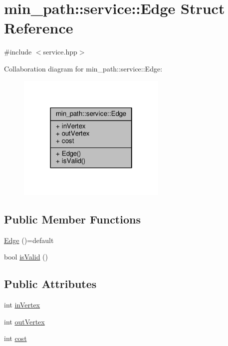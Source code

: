 \hypertarget{a00004}{}\section{min\+\_\+path\+:\+:service\+:\+:Edge Struct Reference}
\label{a00004}


{\ttfamily \#include $<$service.\+hpp$>$}



Collaboration diagram for min\+\_\+path\+:\+:service\+:\+:Edge\+:
\nopagebreak
\begin{figure}[H]
\begin{center}
\leavevmode
\includegraphics[width=202pt]{df/d13/a00085}
\end{center}
\end{figure}
\subsection*{Public Member Functions}
\begin{DoxyCompactItemize}
\item 
\hyperlink{a00004_a1a92aa2befef939e9fca80e90e317e1e_a1a92aa2befef939e9fca80e90e317e1e}{Edge} ()=default
\item 
bool \hyperlink{a00004_a610fccbed0fe90d3c31b9052066d0480_a610fccbed0fe90d3c31b9052066d0480}{is\+Valid} ()
\end{DoxyCompactItemize}
\subsection*{Public Attributes}
\begin{DoxyCompactItemize}
\item 
int \hyperlink{a00004_ae5f860082c48acb267ddf2bbed3d762e_ae5f860082c48acb267ddf2bbed3d762e}{in\+Vertex}
\item 
int \hyperlink{a00004_a7162f7cb4b4bfa81225f2a6be16b770a_a7162f7cb4b4bfa81225f2a6be16b770a}{out\+Vertex}
\item 
int \hyperlink{a00004_ab46c0741b12aad4e05a46a854cd8500f_ab46c0741b12aad4e05a46a854cd8500f}{cost}
\end{DoxyCompactItemize}


